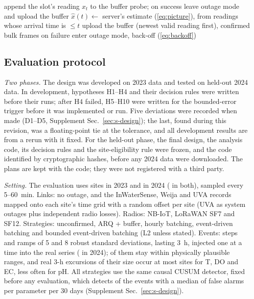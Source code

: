 \begin{algorithm}[t]
\caption{Bounded event-driven batching: node, one slot}
\label{alg:design}
\small
\begin{algorithmic}[1]
\State append the slot's reading $x_t$ to the buffer
   \State probe; on success leave outage mode and upload the buffer \EndIf
  \State \Return
\EndIf
\State $\hat{x}(t) \gets$ server's estimate (\ref{eq:picture}), from readings whose arrival time is $\le t$
  \State upload the buffer (newest valid reading first), confirmed bulk frames
  \State on failure enter outage mode, back-off (\ref{eq:backoff})
\EndIf
\end{algorithmic}
\end{algorithm}

\subsection{Evaluation protocol}
\label{sec:des-protocol}
\emph{Two phases.} The design was developed on 2023 data and tested on held-out 2024 data. In development, hypotheses H1--H4 and their decision rules were written before their runs; after H4 failed, H5--H10 were written for the bounded-error trigger before it was implemented or run. Five deviations were recorded when made (D1--D5, Supplement Sec.~\ref{sec:s-design}); the last, found during this revision, was a floating-point tie at the tolerance, and all development results are from a rerun with it fixed. For the held-out phase, the final design, the analysis code, its decision rules and the site-eligibility rule were frozen, and the code identified by cryptographic hashes, before any 2024 data were downloaded. The plans are kept with the code; they were not registered with a third party.

\emph{Setting.} The evaluation uses \designSites{} sites in 2023 and \confSites{} in 2024 (\sitesBothYears{} in both), sampled every 5--60~min. Links: no outage, and the InWaterSense, Weija and UVA records mapped onto each site's time grid with a random offset per site (UVA as system outages plus independent radio losses). Radios: NB-IoT, LoRaWAN SF7 and SF12. Strategies: unconfirmed, ARQ + buffer, hourly batching, event-driven batching and bounded event-driven batching (L2 unless stated). Events: steps and ramps of 5 and 8 robust standard deviations, lasting 3~h, injected one at a time into the real series (\designEventsConf{} in 2024); \plausibleConf{} of them stay within physically plausible ranges, and real 3-h excursions of their size occur at most sites for T, DO and EC, less often for pH. All strategies use the same causal CUSUM detector, fixed before any evaluation, which detects \detectAll{} of the events with a median of \faMedian{} false alarms per parameter per 30 days (Supplement Sec.~\ref{sec:s-design}).


